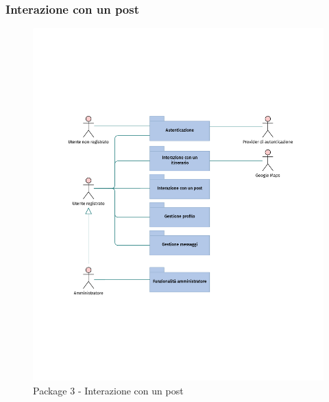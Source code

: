 \documentclass{natourDoc}
\begin{document}
\subsubsection{Interazione con un post}
\begin{figure}[!htbp]
	\centering
	\includegraphics[width=\textwidth, page=4]{./diagrams/useCase.pdf}
	\caption{Package 3 - Interazione con un post}
\end{figure}
\FloatBarrier

\newpage
\end{document}
